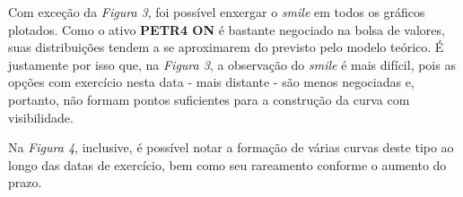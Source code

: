 \documentclass{article}
\begin{document}
Com exceção da \emph{Figura 3}, foi possível enxergar o \emph{smile} em todos os gráficos plotados.
Como o ativo \textbf{PETR4 ON} é bastante negociado na bolsa de valores, suas distribuições tendem a se aproximarem do previsto pelo modelo teórico.
É justamente por isso que, na \emph{Figura 3}, a observação do \emph{smile} é mais difícil, pois as opções com exercício nesta data - mais distante - são menos negociadas e, portanto, não formam pontos suficientes para a construção da curva com visibilidade.

Na \emph{Figura 4}, inclusive, é possível notar a formação de várias curvas deste tipo ao longo das datas de exercício, bem como seu rareamento conforme o aumento do prazo.
\end{document}

